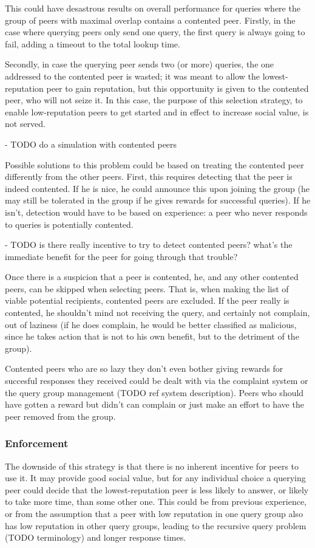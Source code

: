 This could have desastrous results on overall performance for queries where the
group of peers with maximal overlap contains a contented peer. Firstly, in the
case where querying peers only send one query, the first query is always going
to fail, adding a timeout to the total lookup time.

Secondly, in case the querying peer sends two (or more) queries, the one
addressed to the contented peer is wasted; it was meant to allow the
lowest-reputation peer to gain reputation, but this opportunity is given to the
contented peer, who will not seize it. In this case, the purpose of this
selection strategy, to enable low-reputation peers to get started and in effect
to increase social value, is not served.

- TODO do a simulation with contented peers

Possible solutions to this problem could be based on treating the contented peer
differently from the other peers. First, this requires detecting that the peer
is indeed contented. If he is nice, he could announce this upon joining the
group (he may still be tolerated in the group if he gives rewards for successful
queries). If he isn't, detection would have to be based on experience: a peer
who never responds to queries is potentially contented.

- TODO is there really incentive to try to detect contented peers? what's the
  immediate benefit for the peer for going through that trouble?

Once there is a suspicion that a peer is contented, he, and any other contented
peers, can be skipped when selecting peers. That is, when making the list of
viable potential recipients, contented peers are excluded. If the peer really is
contented, he shouldn't mind not receiving the query, and certainly not
complain, out of laziness (if he does complain, he would be better classified as
malicious, since he takes action that is not to his own benefit, but to the
detriment of the group).

Contented peers who are so lazy they don't even bother giving rewards for
succesful responses they received could be dealt with via the complaint system
or the query group management (TODO ref system description). Peers who should
have gotten a reward but didn't can complain or just make an effort to have the
peer removed from the group.

\subsubsection{Enforcement}
\label{sec:selection_overlap_rep_sorted_enforcement}
The downside of this strategy is that there is no inherent incentive for peers
to use it. It may provide good social value, but for any individual choice a
querying peer could decide that the lowest-reputation peer is less likely to
answer, or likely to take more time, than some other one. This could be from
previous experience, or from the assumption that a peer with low reputation in
one query group also has low reputation in other query groups, leading to the
recursive query problem (TODO terminology) and longer response times.

